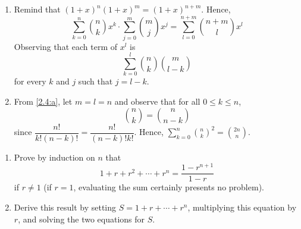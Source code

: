\begin{solution} %
  \begin{enumerate}[label=(\alph*)]
    \item Remind that $(1+x)^n(1+x)^m = (1+x)^{n+m}$. Hence,
    \begin{equation*}
      \sum_{k=0}^n \binom{n}{k}x^k \cdot
      \sum_{j=0}^m \binom{m}{j}x^j
      = \sum_{l=0}^{n+m} \binom{n+m}{l}x^l
    \end{equation*}
    Observing that each term of $x^l$ is
    \begin{equation*}
      \sum_{k=0}^l \binom{n}{k}\binom{m}{l-k}
    \end{equation*}
    for every $k$ and $j$ such that $j = l - k$.
    \item From \ref{2.4:a}, let $m = l = n$ and observe
    that for all $0\leq k\leq n$,
    \begin{equation*}
      \binom{n}{k} = \binom{n}{n - k}
    \end{equation*}
    since $\dfrac{n!}{k!(n-k)!} = \dfrac{n!}{(n-k)!k!}$.
    Hence,
    $\displaystyle\sum_{k=0}^n \binom{n}{k}^2 = \binom{2n}{n}$.
  \end{enumerate}
\end{solution}

\begin{pr} \label{2.5} %
  \begin{enumerate}[label=(\alph*)]
    \item \label{2.5:a}
    Prove by induction on $n$ that
    \begin{equation*}
      1 + r + r^2 + \cdots + r^n = \frac{1-r^{n+1}}{1-r}
    \end{equation*}
    if $r\neq1$ (if $r=1$, evaluating the sum certainly
    presents no problem).
    \item \label{2.5:b}
    Derive this result by setting $S = 1 + r + \cdots + r^n$,
    multiplying this equation by $r$, and solving the
    two equations for $S$.
  \end{enumerate}
\end{pr}

